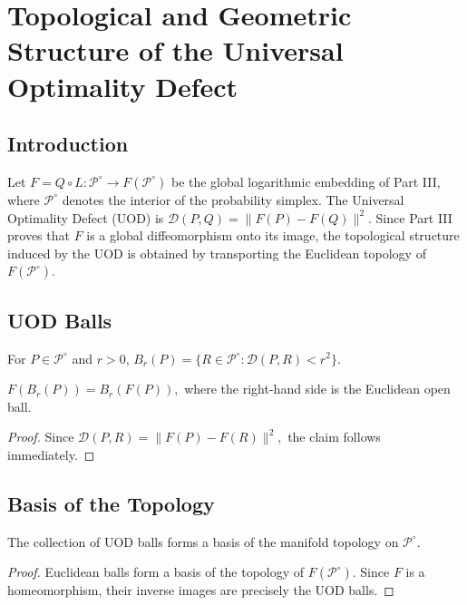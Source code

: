 \chapter[Topological Structure of the UOD]{Topological and Geometric Structure of the Universal Optimality Defect}
\section{Introduction}
Let
$F=Q\circ L:\mathcal P^\circ\rightarrow F(\mathcal P^\circ)$
be the global logarithmic embedding of Part III, where
\(\mathcal P^\circ\) denotes the interior of the
probability simplex. The Universal Optimality Defect (UOD) is
$\mathcal D(P,Q)=\|F(P)-F(Q)\|^2.$
Since Part III proves that \(F\) is a global diffeomorphism onto its
image, the topological structure induced by the UOD is obtained by
transporting the Euclidean topology of \(F(\mathcal P^\circ)\).
\section{UOD Balls}
\begin{definition}
\label{ch:def:24-1}
For \(P\in\mathcal P^\circ\) and \(r>0\),
$B_r(P)=\{R\in\mathcal P^\circ:\mathcal D(P,R)<r^2\}.$
\end{definition}
\begin{proposition}
\label{ch:prop:24-2}
$F(B_r(P))=B_r(F(P)),$
where the right-hand side is the Euclidean open ball.
\end{proposition}
\begin{proof}
Since $\mathcal D(P,R)=\|F(P)-F(R)\|^2,$ the claim follows immediately.
\end{proof}
\section{Basis of the Topology}
\begin{theorem}
\label{ch:thm:24-3}
The collection of UOD balls forms a basis of the manifold topology on
\(\mathcal P^\circ\).
\end{theorem}
\begin{proof}
Euclidean balls form a basis of the topology of
\(F(\mathcal P^\circ)\). Since \(F\) is a homeomorphism,
their inverse images are precisely the UOD balls. 
\end{proof}
